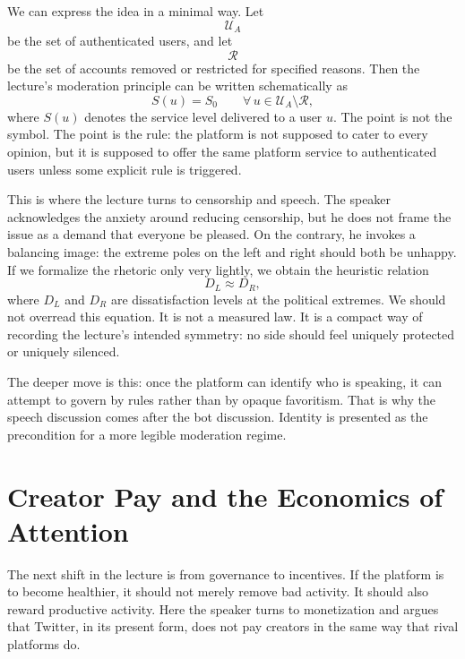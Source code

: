 We can express the idea in a minimal way. Let
\[
\mathcal U_A
\]
be the set of authenticated users, and let
\[
\mathcal R
\]
be the set of accounts removed or restricted for specified reasons. Then the lecture's moderation principle can be written schematically as
\begin{equation}
S(u) = S_0
\qquad
\forall\, u \in \mathcal U_A \setminus \mathcal R,
\end{equation}
where \(S(u)\) denotes the service level delivered to a user \(u\). The point is not the symbol. The point is the rule: the platform is not supposed to cater to every opinion, but it is supposed to offer the same platform service to authenticated users unless some explicit rule is triggered.

This is where the lecture turns to censorship and speech. The speaker acknowledges the anxiety around reducing censorship, but he does not frame the issue as a demand that everyone be pleased. On the contrary, he invokes a balancing image: the extreme poles on the left and right should both be unhappy. If we formalize the rhetoric only very lightly, we obtain the heuristic relation
\begin{equation}
D_L \approx D_R,
\end{equation}
where \(D_L\) and \(D_R\) are dissatisfaction levels at the political extremes. We should not overread this equation. It is not a measured law. It is a compact way of recording the lecture's intended symmetry: no side should feel uniquely protected or uniquely silenced.

The deeper move is this: once the platform can identify who is speaking, it can attempt to govern by rules rather than by opaque favoritism. That is why the speech discussion comes after the bot discussion. Identity is presented as the precondition for a more legible moderation regime.

\section{Creator Pay and the Economics of Attention}

The next shift in the lecture is from governance to incentives. If the platform is to become healthier, it should not merely remove bad activity. It should also reward productive activity. Here the speaker turns to monetization and argues that Twitter, in its present form, does not pay creators in the same way that rival platforms do.

